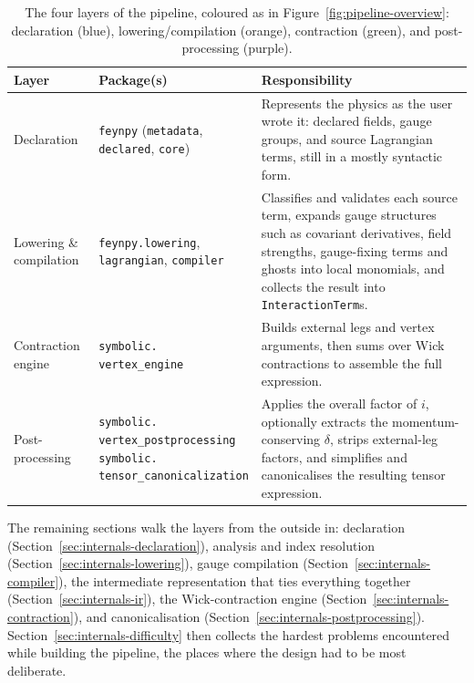\begin{table}[htbp]
\centering
\begin{tabular}{@{}p{2.2cm}p{4.2cm}p{6.4cm}@{}}
\toprule
\textbf{Layer} & \textbf{Package(s)} & \textbf{Responsibility} \\
\midrule

Declaration &
\makecell[l]{\texttt{feynpy} (\texttt{metadata},\\
\texttt{declared}, \texttt{core})} &
Represents the physics as the user wrote it: declared fields, gauge groups, and source Lagrangian terms, still in a mostly syntactic form. \\

Lowering \& compilation &
\makecell[l]{\texttt{feynpy.lowering},\\
\texttt{lagrangian}, \texttt{compiler}} &
Classifies and validates each source term, expands gauge structures such as covariant derivatives, field strengths, gauge-fixing terms and ghosts into local monomials, and collects the result into \texttt{InteractionTerm}s. \\

Contraction engine &
\makecell[l]{\texttt{symbolic.}\\
\texttt{vertex\_engine}} &
Builds external legs and vertex arguments, then sums over Wick contractions to assemble the full expression. \\

Post-processing &
\makecell[l]{\texttt{symbolic.}\\
\texttt{vertex\_postprocessing}\\
\texttt{symbolic.}\\
\texttt{tensor\_canonicalization}} &
Applies the overall factor of $i$, optionally extracts the momentum-conserving $\delta$, strips external-leg factors, and simplifies and canonicalises the resulting tensor expression. \\

\bottomrule
\end{tabular}
\caption{The four layers of the pipeline, coloured as in Figure~\ref{fig:pipeline-overview}: declaration (blue), lowering/compilation (orange), contraction (green), and post-processing (purple).}
\label{tab:internals-layers}
\end{table}



The remaining sections walk the layers from the outside in: declaration (Section~\ref{sec:internals-declaration}), analysis and index resolution (Section~\ref{sec:internals-lowering}), gauge compilation (Section~\ref{sec:internals-compiler}), the  intermediate representation that ties everything together (Section~\ref{sec:internals-ir}), the Wick-contraction engine (Section~\ref{sec:internals-contraction}), and canonicalisation (Section~\ref{sec:internals-postprocessing}). Section~\ref{sec:internals-difficulty} then collects the hardest problems encountered while building the pipeline, the places where the design had to be most deliberate.

